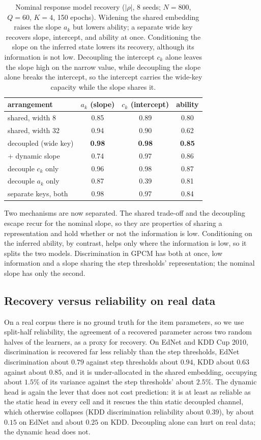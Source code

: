 \documentclass[twocolumn,10pt]{article}
\begin{document}
\begin{table}[t]\centering\small
\begin{tabular}{lccc}
\toprule
arrangement & $a_k$ (slope) & $c_k$ (intercept) & ability\\
\midrule
shared, width 8   & 0.85 & 0.89 & 0.80\\
shared, width 32  & 0.94 & 0.90 & 0.62\\
decoupled (wide key) & \textbf{0.98} & \textbf{0.98} & \textbf{0.85}\\
\quad + dynamic slope & 0.74 & 0.97 & 0.86\\
decouple $c_k$ only  & 0.96 & 0.98 & 0.87\\
decouple $a_k$ only  & 0.87 & 0.39 & 0.81\\
separate keys, both  & 0.98 & 0.97 & 0.84\\
\bottomrule
\end{tabular}
\caption{Nominal response model recovery ($|\rho|$, 8 seeds; $N{=}800$, $Q{=}60$, $K{=}4$,
150 epochs). Widening the shared embedding raises the slope $a_k$ but lowers ability; a
separate wide key recovers slope, intercept, and ability at once. Conditioning the slope on
the inferred state lowers its recovery, although its information is not low. Decoupling the
intercept $c_k$ alone leaves the slope high on the narrow value, while decoupling the slope
alone breaks the intercept, so the intercept carries the wide-key capacity while the slope
shares it.}
\label{tab:nrm}
\end{table}

Two mechanisms are now separated. The shared trade-off and the decoupling escape recur for
the nominal slope, so they are properties of sharing a representation and hold whether or
not the information is low. Conditioning on the inferred ability, by contrast, helps only
where the information is low, so it splits the two models. Discrimination in GPCM has both at
once, low information and a slope sharing the step thresholds' representation; the nominal
slope has only the second.

\subsection{Recovery versus reliability on real data}
On a real corpus there is no ground truth for the item parameters, so we use split-half
reliability, the agreement of a recovered parameter across two random halves of the
learners, as a proxy for recovery. On EdNet and KDD Cup 2010, discrimination is recovered
far less reliably than the step thresholds, EdNet discrimination about $0.79$ against step
thresholds about $0.94$, KDD about $0.63$ against about $0.85$, and it is under-allocated in
the shared embedding, occupying about $1.5\%$ of its variance against the step thresholds'
about $2.5\%$. The dynamic head is again the lever that does not cost prediction: it is at
least as reliable as the static head in every cell and it rescues the thin static decoupled
channel, which otherwise collapses (KDD discrimination reliability about $0.39$), by about
$0.15$ on EdNet and about $0.25$ on KDD. Decoupling alone can hurt on real data; the dynamic
head does not.
\end{document}
